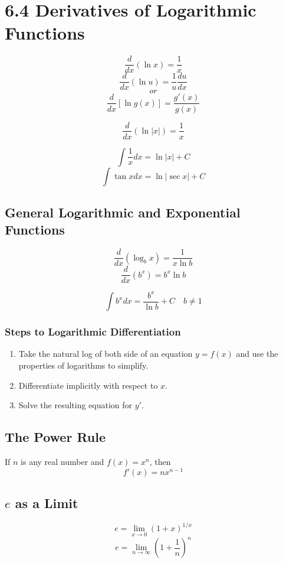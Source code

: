 %
%

\section*{6.4 Derivatives of Logarithmic Functions}

\[ \frac{d}{dx} (\ln x) = \frac{1}{x} \]
\[ \frac{d}{dx} (\ln u) = \frac{1}{u} \frac{du}{dx} \]
\[or\] 
\[ \frac{d}{dx}[\ln g(x)] = \frac{g'(x)}{g(x)} \]

\[ \frac{d}{dx}(\ln |x|) = \frac{1}{x} \]

\[ \int \frac{1}{x}dx = \ln |x| + C \]
\[ \int \tan{x} dx = \ln | \sec{x} | + C  \]

\subsection*{General Logarithmic and Exponential Functions}

\[ \frac{d}{dx} (\log_b x) = \frac{1}{x \ln{b}} \]
\[ \frac{d}{dx} (b^x) = b^x \ln{b} \]

\[ \int b^x dx = \frac{b^x}{\ln{b}} + C \quad b \neq 1 \]

\subsubsection*{Steps to Logarithmic Differentiation}
\begin{enumerate}
\item Take the natural log of both side of an equation \(y = f(x)\) and use the properties of logarithms to simplify.
\item Differentiate implicitly with respect to \(x\).
\item Solve the resulting equation for \(y'\).
\end{enumerate}

\subsection*{The Power Rule}

If \(n\) is any real number and \(f(x)=x^n\), then
\[ f'(x)=nx^{n-1} \]

\subsection*{\(e\) as a Limit}

\[ e = \lim_{x \to 0} {(1 + x)}^{1/x} \]
\[ e = \lim_{n \to \infty} {(1 + \frac{1}{n})}^n \]
